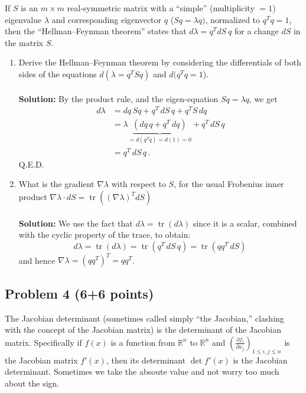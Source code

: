\documentclass{article}
\newcommand{\R}{\mathbb{R}}
\newcommand{\tr}{\operatorname{tr}}
\begin{document}
If $S$ is an $m\times m$ real-symmetric matrix with a ``simple''
(multiplicity $=1$) eigenvalue $\lambda$ and corresponding eigenvector
$q$ ($Sq=\lambda q)$, normalized to $q^{T}q=1$, then the ``Hellman--Feynman
theorem'' states that 
$d\lambda=q^{T}dS\:q$
 for a change $dS$ in the matrix $S$.
\begin{enumerate}
\item Derive the Hellman--Feynman theorem by considering the differentials
of both sides of the equations $d(\lambda=q^{T}Sq)$ and $d(q^{T}q=1$).
\\
\\
\textbf{Solution:} By the product rule, and the eigen-equation $Sq=\lambda q$, we get
\begin{align*}
    d\lambda &= dq\,Sq + q^T\,dS\,q + q^TS\,dq \\
    &= \lambda \underbrace{(dq\,q + q^T\,dq)}_{=d(q^T q) =d(1)=0} + q^T\,dS\,q \\
    &= q^T\,dS\,q \, .
\end{align*}
Q.E.D.

\item What is the gradient $\nabla\lambda$ with respect to $S$, for the
usual Frobenius inner product $\nabla\lambda\cdot 
dS=\tr((\nabla\lambda)^{T}dS)$
\\
\\
\textbf{Solution:} We use the fact that $d\lambda = \tr(d\lambda)$ since it is a scalar, combined with the cyclic property of the trace, to obtain:
$$
d\lambda = \tr(d\lambda)=\tr(q^T\,dS\,q)=\tr(qq^T\,dS) \,
$$
and hence $\boxed{\nabla \lambda = (qq^T)^T = qq^T}$.


\end{enumerate}

\subsection*{Problem 4 (6+6 points)}
The Jacobian determinant (sometimes called simply ``the Jacobian,'' clashing with the concept of the Jacobian matrix) is
the determinant of the Jacobian matrix.  Specifically if $f(x)$ is a function from $\R^n$ to $\R^n$ and
$(\frac{\partial f_i}{\partial x_j})_{1 \le i,j \le n}$ is the Jacobian matrix $f'(x)$, then its determinant $\det f'(x)$ is the Jacobian determinant.
Sometimes we take the absoute value and not worry too much about the sign.
\end{document}
